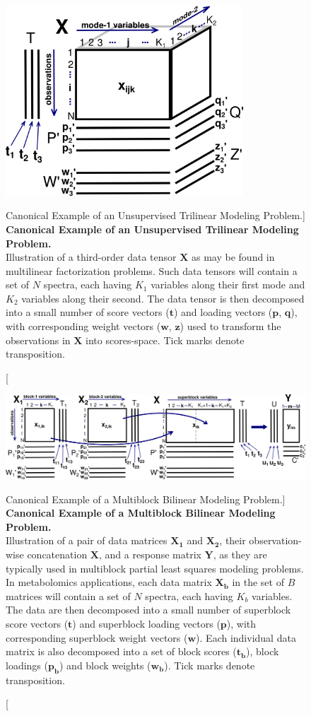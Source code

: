 \begin{figure}
\includegraphics[width=3.5in]{figs/mva/02.png}
\caption
      [Canonical Example of an Unsupervised Trilinear Modeling Problem.]{
  {\bf Canonical Example of an Unsupervised Trilinear Modeling Problem.}
  \\
  Illustration of a third-order data tensor $\mathbf{X}$ as may be found in
  multilinear factorization problems. Such data tensors will contain a set
  of $N$ spectra, each having $K_1$ variables along their first mode and
  $K_2$ variables along their second. The data tensor is then decomposed
  into a small number of score vectors ($\mathbf{t}$) and loading vectors
  ($\mathbf{p}$, $\mathbf{q}$), with corresponding weight vectors
  ($\mathbf{w}$, $\mathbf{z}$) used to transform the observations in
  $\mathbf{X}$ into scores-space. Tick marks denote transposition.
}
\end{figure}

\begin{figure}[hb!]
\includegraphics[width=6.5in]{figs/mva/03.png}
\caption
      [Canonical Example of a Multiblock Bilinear Modeling Problem.]{
  {\bf Canonical Example of a Multiblock Bilinear Modeling Problem.}
  \\
  Illustration of a pair of data matrices $\mathbf{X_1}$ and $\mathbf{X_2}$,
  their observation-wise concatenation $\mathbf{X}$, and a response matrix
  $\mathbf{Y}$, as they are typically used in multiblock partial least squares
  modeling problems. In metabolomics applications, each data matrix
  $\mathbf{X_b}$ in the set of $B$ matrices will contain a set of $N$ spectra,
  each having $K_b$ variables. The data are then decomposed into a small number
  of superblock score vectors ($\mathbf{t}$) and superblock loading vectors
  ($\mathbf{p}$), with corresponding superblock weight vectors ($\mathbf{w}$).
  Each individual data matrix is also decomposed into a set of block scores
  ($\mathbf{t_b}$), block loadings ($\mathbf{p_b}$) and block weights
  ($\mathbf{w_b}$). Tick marks denote transposition.
}
\end{figure}

